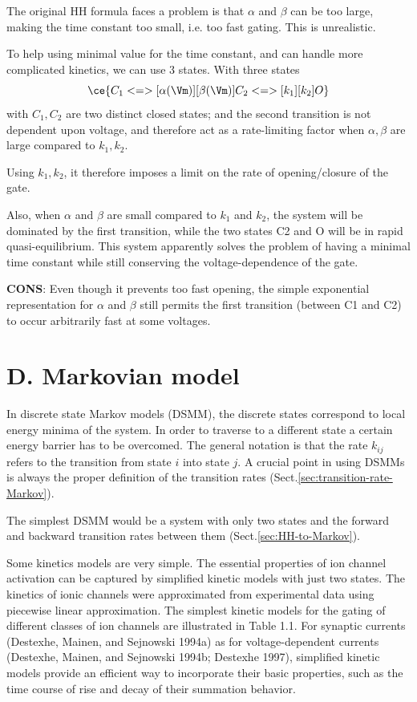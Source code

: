 The original HH formula faces a problem is that $\alpha$ and $\beta$ can be too
large, making the time constant too small, i.e. too fast gating. This is
unrealistic.

To help using minimal value for the time constant, and can handle more
complicated kinetics, we can use 3 states. With three states
\begin{equation}
\ce{C_1 <=>[\alpha(\Vm)][\beta(\Vm)] C_2  <=>[k_1][k_2] O}
\end{equation}
with $C_1, C_2 $ are two distinct closed states; and the second transition is
not dependent upon voltage, and therefore act as a rate-limiting factor when
$\alpha, \beta$ are large compared to $k_1, k_2$.

Using $k_1, k_2$, it therefore imposes a limit on the rate of opening/closure of
the gate.

Also, when $\alpha$ and $\beta$ are small compared to $k_1$ and $k_2$, the
system will be dominated by the first transition, while the two states C2 and O
will be in rapid quasi-equilibrium.
This system apparently solves the problem of having a minimal time constant
while still conserving the voltage-dependence of the gate.

{\bf CONS}: Even though it prevents too fast opening, the simple exponential
representation for $\alpha$ and $\beta$ still permits the first transition
(between C1 and C2) to occur arbitrarily fast at some voltages.

\section{D. Markovian model}
\label{sec:markovian-model}


In discrete state Markov models (DSMM), the discrete states correspond to local
energy minima of the system. In order to traverse to a different state a certain
energy barrier has to be overcomed. The general notation is that the rate
$k_{ij}$ refers to the transition from state $i$ into state $j$.
A crucial point in using DSMMs is always the proper definition of the transition
rates (Sect.\ref{sec:transition-rate-Markov}).


The simplest DSMM would be a system with only two states and the forward and
backward transition rates between them (Sect.\ref{sec:HH-to-Markov}).

Some kinetics models are very simple.  The essential properties of ion channel
activation can be captured by simplified kinetic models with just two states.
The kinetics of ionic channels were approximated from experimental data using
piecewise linear approximation. The simplest kinetic models for the gating of
different classes of ion channels are illustrated in Table 1.1. For synaptic
currents (Destexhe, Mainen, and Sejnowski 1994a) as for voltage-dependent
currents (Destexhe, Mainen, and Sejnowski 1994b; Destexhe 1997), simplified
kinetic models provide an efficient way to incorporate their basic properties,
such as the time course of rise and decay of their summation behavior.

